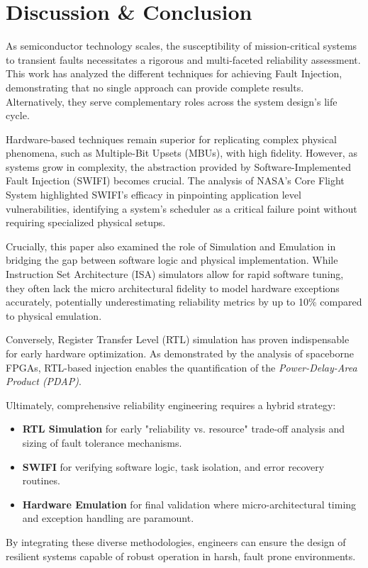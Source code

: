 \section{Discussion \& Conclusion}
As semiconductor technology scales, the susceptibility of mission-critical systems to transient faults necessitates a rigorous and multi-faceted reliability assessment. This work has analyzed the different techniques for achieving Fault Injection, demonstrating that no single approach can provide complete results. Alternatively, they serve complementary roles across the system design's life cycle.

Hardware-based techniques remain superior for replicating complex physical phenomena, such as Multiple-Bit Upsets (MBUs), with high fidelity. However, as systems grow in complexity, the abstraction provided by Software-Implemented Fault Injection (SWIFI) becomes crucial. The analysis of NASA’s Core Flight System highlighted SWIFI's efficacy in pinpointing application level vulnerabilities, identifying a system's scheduler as a critical failure point without requiring specialized physical setups.

Crucially, this paper also examined the role of Simulation and Emulation in bridging the gap between software logic and physical implementation. While Instruction Set Architecture (ISA) simulators allow for rapid software tuning, they often lack the micro architectural fidelity to model hardware exceptions accurately, potentially underestimating reliability metrics by up to 10\% compared to physical emulation.

Conversely, Register Transfer Level (RTL) simulation has proven indispensable for early hardware optimization. As demonstrated by the analysis of spaceborne FPGAs, RTL-based injection enables the quantification of the \textit{Power-Delay-Area Product (PDAP)}.

Ultimately, comprehensive reliability engineering requires a hybrid strategy:
\begin{itemize}
    \item \textbf{RTL Simulation} for early "reliability vs. resource" trade-off analysis and sizing of fault tolerance mechanisms.
    \item \textbf{SWIFI} for verifying software logic, task isolation, and error recovery routines.
    \item \textbf{Hardware Emulation} for final validation where micro-architectural timing and exception handling are paramount.
\end{itemize}
By integrating these diverse methodologies, engineers can ensure the design of resilient systems capable of robust operation in harsh, fault prone environments.